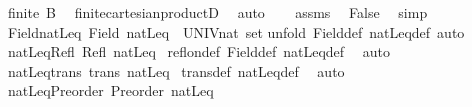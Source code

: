 \begin{isabellebody}
\ {\isachardoublequoteopen}finite\ B{\isachardoublequoteclose}\ \isamarkupfalse%
\ finite{\isacharunderscore}{\kern0pt}cartesian{\isacharunderscore}{\kern0pt}productD{}\ \isamarkupfalse%
\ auto\isanewline
\ \ \isamarkupfalse%
\ assms{\isacharparenleft}{\kern0pt}{}{\isacharparenright}{\kern0pt}\ \isamarkupfalse%
\ False\ \isamarkupfalse%
\ simp\isanewline
{}\isamarkupfalse%
%
\endisatagproof
{\isafoldproof}%
%
\isadelimproof
%
\endisadelimproof
%
\isadelimdocument
%
\endisadelimdocument
%
\isatagdocument
%
\isamarkuptrue%
%
\endisatagdocument
{\isafolddocument}%
%
\isadelimdocument
%
\endisadelimdocument
{}\isamarkupfalse%
\ Field{\isacharunderscore}{\kern0pt}natLeq{\isacharcolon}{\kern0pt}\ {\isachardoublequoteopen}Field\ natLeq\ {\isacharequal}{\kern0pt}\ {\isacharparenleft}{\kern0pt}UNIV{\isacharcolon}{\kern0pt}{\isacharcolon}{\kern0pt}nat\ set{\isacharparenright}{\kern0pt}{\isachardoublequoteclose}\isanewline
%
\isadelimproof
%
\endisadelimproof
%
\isatagproof
{}\isamarkupfalse%
{\isacharparenleft}{\kern0pt}unfold\ Field{\isacharunderscore}{\kern0pt}def\ natLeq{\isacharunderscore}{\kern0pt}def{\isacharcomma}{\kern0pt}\ auto{\isacharparenright}{\kern0pt}%
\endisatagproof
{\isafoldproof}%
%
\isadelimproof
\isanewline
%
\endisadelimproof
\isanewline
{}\isamarkupfalse%
\ natLeq{\isacharunderscore}{\kern0pt}Refl{\isacharcolon}{\kern0pt}\ {\isachardoublequoteopen}Refl\ natLeq{\isachardoublequoteclose}\isanewline
%
\isadelimproof
%
\endisadelimproof
%
\isatagproof
{}\isamarkupfalse%
\ refl{\isacharunderscore}{\kern0pt}on{\isacharunderscore}{\kern0pt}def\ Field{\isacharunderscore}{\kern0pt}def\ natLeq{\isacharunderscore}{\kern0pt}def\ \isamarkupfalse%
\ auto%
\endisatagproof
{\isafoldproof}%
%
\isadelimproof
\isanewline
%
\endisadelimproof
\isanewline
{}\isamarkupfalse%
\ natLeq{\isacharunderscore}{\kern0pt}trans{\isacharcolon}{\kern0pt}\ {\isachardoublequoteopen}trans\ natLeq{\isachardoublequoteclose}\isanewline
%
\isadelimproof
%
\endisadelimproof
%
\isatagproof
{}\isamarkupfalse%
\ trans{\isacharunderscore}{\kern0pt}def\ natLeq{\isacharunderscore}{\kern0pt}def\ \isamarkupfalse%
\ auto%
\endisatagproof
{\isafoldproof}%
%
\isadelimproof
\isanewline
%
\endisadelimproof
\isanewline
{}\isamarkupfalse%
\ natLeq{\isacharunderscore}{\kern0pt}Preorder{\isacharcolon}{\kern0pt}\ {\isachardoublequoteopen}Preorder\ natLeq{\isachardoublequoteclose}\isanewline

\end{isabellebody}
